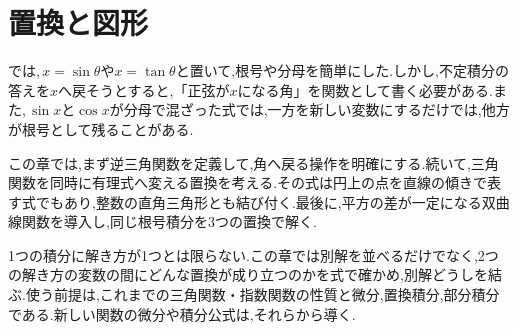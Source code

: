 \chapter{置換と図形}\label{章:置換の背景}

では,\,$x=\sin\theta$や$x=\tan\theta$と置いて,根号や分母を簡単にした.しかし,不定積分の答えを$x$へ戻そうとすると,「正弦が$x$になる角」を関数として書く必要がある.また,\,$\sin x$と$\cos x$が分母で混ざった式では,一方を新しい変数にするだけでは,他方が根号として残ることがある.

この章では,まず逆三角関数を定義して,角へ戻る操作を明確にする.続いて,三角関数を同時に有理式へ変える置換を考える.その式は円上の点を直線の傾きで表す式でもあり,整数の直角三角形とも結び付く.最後に,平方の差が一定になる双曲線関数を導入し,同じ根号積分を3つの置換で解く.

1つの積分に解き方が1つとは限らない.この章では別解を並べるだけでなく,2つの解き方の変数の間にどんな置換が成り立つのかを式で確かめ,別解どうしを結ぶ.使う前提は,これまでの三角関数・指数関数の性質と微分,置換積分,部分積分である.新しい関数の微分や積分公式は,それらから導く.

%
%
%
%
%
%
%
